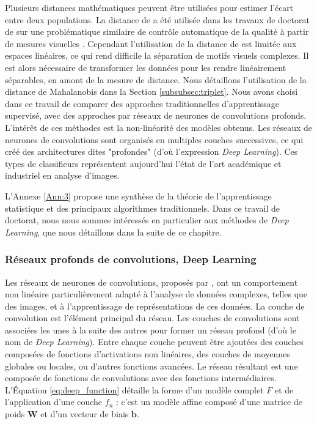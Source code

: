 Plusieurs distances mathématiques peuvent être utilisées pour estimer l'écart entre deux populations.
La distance de \citeauthor{mahalanobis_generalised_1936} \cite{mahalanobis_generalised_1936} a été utilisée dans les travaux de doctorat de \citeauthor{lacombe_exploitation_2018a} sur une problématique similaire de contrôle automatique de la qualité à partir de mesures visuelles \cite{lacombe_exploitation_2018a}.
Cependant l'utilisation de la distance de \citeauthor{mahalanobis_generalised_1936} est limitée aux espaces linéaires, ce qui rend difficile la séparation de motifs visuels complexes.
Il est alors nécessaire de transformer les données pour les rendre linéairement séparables, en amont de la mesure de distance.
Nous détaillons l'utilisation de la distance de Mahalanobis dans la Section \ref{subsubsec:triplet}.
Nous avons choisi dans ce travail de comparer des approches traditionnelles d'apprentissage supervisé, avec des approches par réseaux de neurones de convolutions profonds.
L'intérêt de ces méthodes est la non-linéarité des modèles obtenus.
Les réseaux de neurones de convolutions sont organisés en multiples couches successives, ce qui créé des architectures dites "profondes" (d'où l'expression \textit{Deep Learning}).
Ces types de classifieurs représentent aujourd'hui l'état de l'art académique et industriel en analyse d'images.

L'Annexe \ref{Ann:3} propose une synthèse de la théorie de l'apprentissage statistique et des principaux algorithmes traditionnels.
Dans ce travail de doctorat, nous nous sommes intéressés en particulier aux méthodes de \textit{Deep Learning}, que nous détaillons dans la suite de ce chapitre.


\subsubsection{Réseaux profonds de convolutions, Deep Learning} \label{subsubsec:deep_learning}
Les réseaux de neurones de convolutions, proposés par \citeauthor{lecun_backpropagation_1989} \cite{lecun_backpropagation_1989}, ont un comportement non linéaire particulièrement adapté à l'analyse de données complexes, telles que des images, et à l'apprentissage de représentations de ces données.
La couche de convolution est l'élément principal du réseau.
Les couches de convolutions sont associées les unes à la suite des autres pour former un réseau profond (d'où le nom de \textit{Deep Learning}).
Entre chaque couche peuvent être ajoutées des couches composées de fonctions d'activations non linéaires, des couches de moyennes globales ou locales, ou d'autres fonctions avancées.
Le réseau résultant est une composée de fonctions de convolutions avec des fonctions intermédiaires.
L'Équation \ref{eq:deep_function} détaille la forme d'un modèle complet $F$ et de l'application d'une couche $f_n$ : c'est un modèle affine composé d'une matrice de poids $\mathbf{W}$ et d'un vecteur de biais $\mathbf{b}$.

